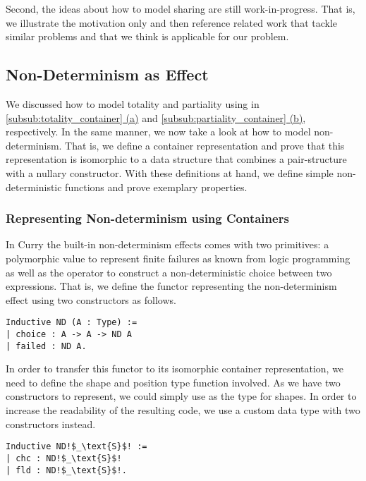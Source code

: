 Second, the ideas about how to model sharing are still work\--in\--progress.
That is, we illustrate the motivation only and then reference related work that tackle similar problems and that we think is applicable for our problem.

\subsection{Non\--Determinism as Effect}

We discussed how to model totality and partiality using  in \hyperref[subsub:totality_container]{\autoref{subsub:totality_container} (a)} and \hyperref[subsub:partiality_container]{\autoref{subsub:partiality_container} (b)}, respectively.
In the same manner, we now take a look at how to model non\--determinism.
That is, we define a container representation and prove that this representation is isomorphic to a data structure that combines a pair\--structure with a nullary constructor.
With these definitions at hand, we define simple non\--deterministic functions and prove exemplary properties.

\subsubsection{Representing Non\--determinism using Containers}
In Curry the built\--in non\--determinism effects comes with two primitives: a polymorphic value  to represent finite failures as known from logic programming as well as the operator  to construct a non\--deterministic choice between two expressions.
That is, we define the functor representing the non\--determinism effect using two constructors as follows. 

\begin{verbatim}
Inductive ND (A : Type) :=
| choice : A -> A -> ND A
| failed : ND A.
\end{verbatim}

In order to transfer this functor to its isomorphic container representation, we need to define the shape and position type function involved.
As we have two constructors to represent, we could simply use  as the type for shapes.
In order to increase the readability of the resulting code, we use a custom data type with two constructors instead.

\begin{verbatim}
Inductive ND!$_\text{S}$! :=
| chc : ND!$_\text{S}$!
| fld : ND!$_\text{S}$!.
\end{verbatim}

